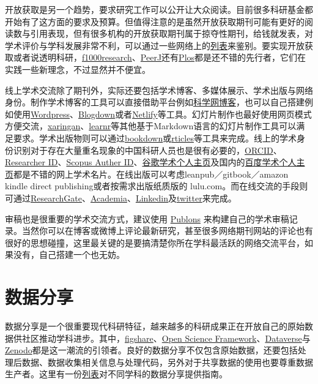 \documentclass[]{tufte-book}
\begin{document}
开放获取是另一个趋势，要求研究工作可以公开让大众阅读。目前很多科研基金都开始有了这方面的要求及预算。但值得注意的是虽然开放获取期刊可能有更好的阅读数与引用表现，但有很多机构的开放获取期刊属于掠夺性期刊，给钱就发表，对学术评价与学科发展非常不利，可以通过一些网络上的\href{https://beallslist.weebly.com/}{列表}来鉴别。要实现开放获取或者说透明科研，\href{https://f1000research.com/}{f1000research}、\href{https://peerj.org/}{PeerJ}还有\href{https://www.plos.org/}{Plos}都是还不错的先行者，它们在实践一些新理念，不过显然并不便宜。

线上学术交流除了期刊外，实际还要包括学术博客、多媒体展示、学术出版与网络身份。制作学术博客的工具可以直接借助平台例如\href{http://blog.sciencenet.cn/}{科学网博客}，也可以自己搭建例如使用\href{https://zh-cn.wordpress.com/}{Wordpress}、\href{https://bookdown.org/yihui/blogdown/}{Blogdown}或者\href{https://www.netlify.com/}{Netlify}等工具。幻灯片制作也最好使用网页模式方便交流，\href{https://github.com/yihui/xaringan}{xaringan}、\href{https://rstudio.github.io/learnr/}{learnr}等其他基于Markdown语言的幻灯片制作工具可以满足要求。学术出版物则可以通过\href{https://bookdown.org/}{bookdown}或\href{https://github.com/rstudio/rticles}{rticles}等工具来完成。线上的学术身份识别对于存在大量重名现象的中国科研人员也是很有必要的，\href{https://orcid.org/}{ORCID}、\href{http://www.researcherid.com/}{Researcher ID}、\href{https://www.scopus.com/}{Scopus Auther ID}、\href{https://scholar.google.com}{谷歌学术个人主页}及国内的\href{https://xueshu.baidu.com/}{百度学术个人主页}都是不错的网上学术名片。在线出版可以考虑leanpub／gitbook／amazon kindle direct publishing或者按需求出版纸质版的 lulu.com。而在线交流的手段则可通过\href{https://www.researchgate.net/}{ResearchGate}、\href{https://www.academia.edu/}{Academia}、\href{https://www.linkedin.com/}{Linkedin}及\href{https://twitter.com/}{twitter}来完成。

审稿也是很重要的学术交流方式，建议使用 \href{https://publons.com/home/}{Publons} 来构建自己的学术审稿记录。当然你可以在博客或微博上评论最新研究，甚至很多网络期刊网站的评论也有很好的思想碰撞，这里最关键的是要搞清楚你所在学科最活跃的网络交流平台，如果没有，自己搭建一个也无妨。

\hypertarget{ux6570ux636eux5206ux4eab}{%
\section*{数据分享}\label{ux6570ux636eux5206ux4eab}}

数据分享是一个很重要现代科研特征，越来越多的科研成果正在开放自己的原始数据供社区推动学科进步。其中，\href{https://figshare.com/}{figshare}、\href{https://osf.io/}{Open Science Framework}、\href{https://dataverse.org/}{Dataverse}与\href{https://zenodo.org/}{Zenodo}都是这一潮流的引领者。良好的数据分享不仅包含原始数据，还要包括处理后数据、数据收集相关信息与处理代码，另外对于共享数据的使用也要尊重数据生产者。这里有一份\href{https://www.nature.com/sdata/policies/repositories}{列表}对不同学科的数据分享提供指南。
\end{document}
